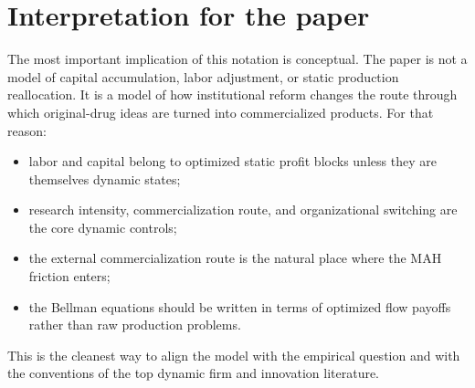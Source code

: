 \documentclass[12pt,fontset=none]{ctexart}
\begin{document}
\section{Interpretation for the paper}

The most important implication of this notation is conceptual. The paper is not a model
of capital accumulation, labor adjustment, or static production reallocation. It is a model
of how institutional reform changes the route through which original-drug ideas are turned
into commercialized products. For that reason:

\begin{itemize}[leftmargin=2em]
    \item labor and capital belong to optimized static profit blocks unless they are themselves dynamic states;
    \item research intensity, commercialization route, and organizational switching are the core dynamic controls;
    \item the external commercialization route is the natural place where the MAH friction enters;
    \item the Bellman equations should be written in terms of optimized flow payoffs rather than raw production problems.
\end{itemize}

This is the cleanest way to align the model with the empirical question and with the
conventions of the top dynamic firm and innovation literature.
\end{document}
